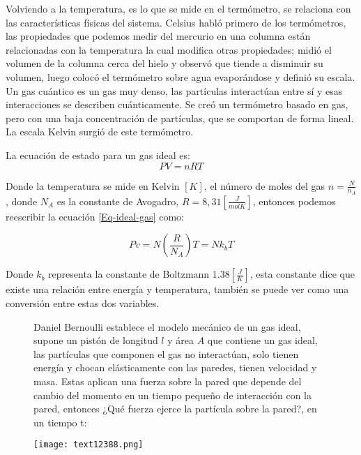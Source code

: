 \documentclass[11pt,fleqn]{book}
\begin{document}
Volviendo a la temperatura, es lo que se mide en el termómetro, se relaciona con las características físicas del sistema. Celsius habló primero de los termómetros, las propiedades que podemos medir del mercurio en una columna están relacionadas con la temperatura la cual modifica otras propiedades; midió el volumen de la columna cerca del hielo y observó que tiende a disminuir su volumen, luego colocó el termómetro sobre agua evaporándose y definió su escala. Un gas cuántico es un gas muy denso, las partículas interactúan entre sí y esas interacciones se describen cuánticamente. Se creó un termómetro basado en gas, pero con una baja concentración de partículas, que se comportan de forma lineal. La escala Kelvin surgió de este termómetro.

La ecuación de estado para un gas ideal es:
\begin{equation}
    PV=nRT
    \label{Eq-ideal-gas}
\end{equation}

Donde la temperatura se mide en Kelvin $[K]$, el número de moles del gas $n=\frac{N}{n_{A}}$, donde $N_{A}$ es la constante de Avogadro, $R=8,31 [\frac{J}{molK}]$, entonces podemos reescribir la ecuación \ref{Eq-ideal-gas} como:

\begin{equation}
    Pv=N\left(\frac{R}{N_{A}}\right)T=Nk_{b}T
\end{equation}

Donde $k_{b}$ representa la constante de Boltzmann $1.38 [\frac{J}{K}]$, esta constante dice que existe una relación entre energía y temperatura, también se puede ver como una conversión entre estas dos variables. 

\begin{figure}[H]
    \begin{minipage}[c]{0.6\linewidth}
    \hspace{5mm} Daniel Bernoulli establece el modelo mecánico de un gas ideal, supone un pistón de longitud $l$ y área $A$ que contiene un gas ideal, las partículas que componen el gas no interactúan, solo tienen energía y chocan elásticamente con las paredes, tienen velocidad y masa. Estas aplican una fuerza sobre la pared que depende del cambio del momento en un tiempo pequeño de interacción con la pared, entonces ¿Qué fuerza ejerce la partícula sobre la pared?, en un tiempo t:
    \end{minipage}\hspace{1cm}
    \begin{minipage}[c]{0.5\linewidth}
    \texttt{[image: text12388.png]}
    \end{minipage}
\end{figure}
\vspace{-9mm} 
\end{document}
